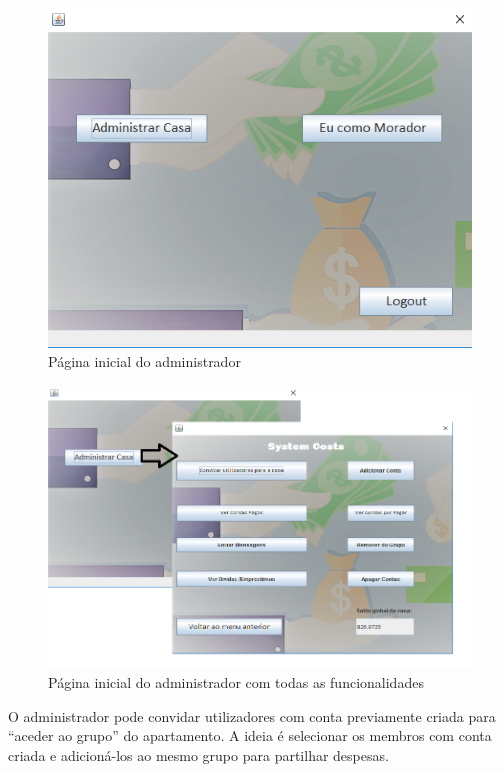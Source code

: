 \begin{figure}[h!]
	\centering
	\includegraphics[scale=0.6]{imagens/interface/paginicialadmin}  
	\caption{Página inicial do administrador}  
\end{figure}

\begin{figure}[h!]
	\centering
	\includegraphics[scale=0.6]{imagens/interface/botaoadmin}  
	\caption{Página inicial do administrador com todas as funcionalidades}  
\end{figure}

\newpage

O administrador pode convidar utilizadores com conta previamente criada para “aceder ao grupo” do apartamento. A ideia é selecionar os membros com conta criada e adicioná-los ao mesmo grupo para partilhar despesas.

